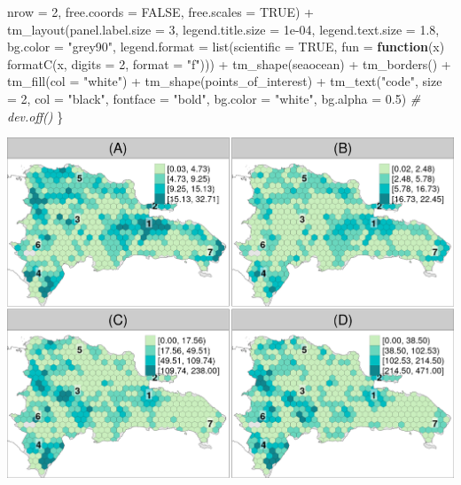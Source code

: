 \documentclass[10pt,landscape,a3paper]{article}
\newenvironment{Shaded}{\begin{snugshade}}{\end{snugshade}}
\newcommand{\AttributeTok}[1]{\textcolor[rgb]{0.77,0.63,0.00}{#1}}
\newcommand{\CommentTok}[1]{\textcolor[rgb]{0.56,0.35,0.01}{\textit{#1}}}
\newcommand{\ConstantTok}[1]{\textcolor[rgb]{0.00,0.00,0.00}{#1}}
\newcommand{\ControlFlowTok}[1]{\textcolor[rgb]{0.13,0.29,0.53}{\textbf{#1}}}
\newcommand{\DecValTok}[1]{\textcolor[rgb]{0.00,0.00,0.81}{#1}}
\newcommand{\FloatTok}[1]{\textcolor[rgb]{0.00,0.00,0.81}{#1}}
\newcommand{\FunctionTok}[1]{\textcolor[rgb]{0.00,0.00,0.00}{#1}}
\newcommand{\NormalTok}[1]{#1}
\newcommand{\SpecialCharTok}[1]{\textcolor[rgb]{0.00,0.00,0.00}{#1}}
\newcommand{\StringTok}[1]{\textcolor[rgb]{0.31,0.60,0.02}{#1}}
\begin{document}
\begin{Shaded}
\begin{Highlighting}[]
        \AttributeTok{nrow =} \DecValTok{2}\NormalTok{, }\AttributeTok{free.coords =} \ConstantTok{FALSE}\NormalTok{, }\AttributeTok{free.scales =} \ConstantTok{TRUE}\NormalTok{) }\SpecialCharTok{+} \FunctionTok{tm\_layout}\NormalTok{(}\AttributeTok{panel.label.size =} \DecValTok{3}\NormalTok{,}
        \AttributeTok{legend.title.size =} \FloatTok{1e{-}04}\NormalTok{, }\AttributeTok{legend.text.size =} \FloatTok{1.8}\NormalTok{, }\AttributeTok{bg.color =} \StringTok{"grey90"}\NormalTok{, }\AttributeTok{legend.format =} \FunctionTok{list}\NormalTok{(}\AttributeTok{scientific =} \ConstantTok{TRUE}\NormalTok{,}
            \AttributeTok{fun =} \ControlFlowTok{function}\NormalTok{(x) }\FunctionTok{formatC}\NormalTok{(x, }\AttributeTok{digits =} \DecValTok{2}\NormalTok{, }\AttributeTok{format =} \StringTok{"f"}\NormalTok{))) }\SpecialCharTok{+} \FunctionTok{tm\_shape}\NormalTok{(seaocean) }\SpecialCharTok{+}
        \FunctionTok{tm\_borders}\NormalTok{() }\SpecialCharTok{+} \FunctionTok{tm\_fill}\NormalTok{(}\AttributeTok{col =} \StringTok{"white"}\NormalTok{) }\SpecialCharTok{+} \FunctionTok{tm\_shape}\NormalTok{(points\_of\_interest) }\SpecialCharTok{+} \FunctionTok{tm\_text}\NormalTok{(}\StringTok{"code"}\NormalTok{,}
        \AttributeTok{size =} \DecValTok{2}\NormalTok{, }\AttributeTok{col =} \StringTok{"black"}\NormalTok{, }\AttributeTok{fontface =} \StringTok{"bold"}\NormalTok{, }\AttributeTok{bg.color =} \StringTok{"white"}\NormalTok{, }\AttributeTok{bg.alpha =} \FloatTok{0.5}\NormalTok{)}
    \CommentTok{\# dev.off()}
\NormalTok{\}}
\end{Highlighting}
\end{Shaded}

\begin{center}\includegraphics{img/modelling/lta-esda-16} \end{center}
\end{document}
